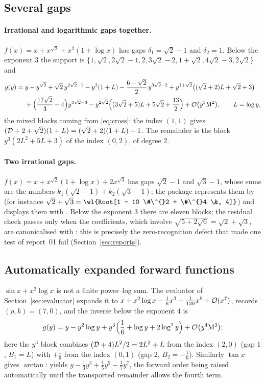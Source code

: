 \subsection{Several gaps}

\paragraph{Irrational and logarithmic gaps together.} $f(x)=x+x^{\sqrt2}+x^2(1+\log x)$ has gaps $\delta_1=\sqrt2-1$ and $\delta_2=1$. Below the exponent $3$ the support is $\{1,\sqrt2,2\sqrt2-1,2,3\sqrt2-2,1+\sqrt2,4\sqrt2-3,2\sqrt2\}$ and
\begin{align*}
 g(y)={}&y-y^{\sqrt2}+\sqrt2\,y^{2\sqrt2-1}-y^2(1+L)-\frac{6-\sqrt2}{2}\,y^{3\sqrt2-2}+y^{1+\sqrt2}\bigl((\sqrt2+2)L+\sqrt2+3\bigr)\\
 &+\Bigl(\frac{17\sqrt2}{3}-4\Bigr)y^{4\sqrt2-3}-y^{2\sqrt2}\Bigl((3\sqrt2+5)L+5\sqrt2+\frac{13}{2}\Bigr)+\mathcal O\bigl(y^3\mathrm M^2\bigr),\qquad L=\log y ,
\end{align*}
the mixed blocks coming from \eqref{eq:cross}: the index $(1,1)$ gives $(\mathcal D+2+\sqrt2)(1+L)=(\sqrt2+2)(1+L)+1$. The remainder is the block $y^3(2L^2+5L+3)$ of the index $(0,2)$, of degree $2$.

\paragraph{Two irrational gaps.} $f(x)=x+x^{\sqrt2}(1+\log x)+2x^{\sqrt3}$ has gaps $\sqrt2-1$ and $\sqrt3-1$, whose sums are the numbers $k_1(\sqrt2-1)+k_2(\sqrt3-1)$; the package represents them by  (for instance $\sqrt2+\sqrt3=\wl{Root[1 - 10 \#\^{}2 + \#\^{}4 \&, 4]}$) and displays them with . Below the exponent $3$ there are eleven blocks; the residual check passes only when the coefficients, which involve $\sqrt{5+2\sqrt6}=\sqrt2+\sqrt3$, are canonicalised with : this is precisely the zero-recognition defect that made one test of report~01 fail (Section~\ref{sec:reports}).

\subsection{Automatically expanded forward functions}

$\sin x+x^2\log x$ is not a finite power--log sum. The evaluator of Section~\ref{sec:evaluator} expands it to $x+x^2\log x-\tfrac16x^3+\tfrac1{120}x^5+\mathcal O(x^7)$, records $(\rho,k)=(7,0)$, and the inverse below the exponent $4$ is
\[
 g(y)=y-y^2\log y+y^3\Bigl(\frac16+\log y+2\log^2y\Bigr)+\mathcal O\bigl(y^4\mathrm M^3\bigr);
\]
here the $y^3$ block combines $(\mathcal D+4)L^2/2=2L^2+L$ from the index $(2,0)$ (gap $1$, $B_1=L$) with $+\tfrac16$ from the index $(0,1)$ (gap $2$, $B_2=-\tfrac16$). Similarly $\tan x$ gives $\arctan$:  yields $y-\tfrac13y^3+\tfrac15y^5-\tfrac17y^7$, the forward order being raised automatically until the transported remainder allows the fourth term.

